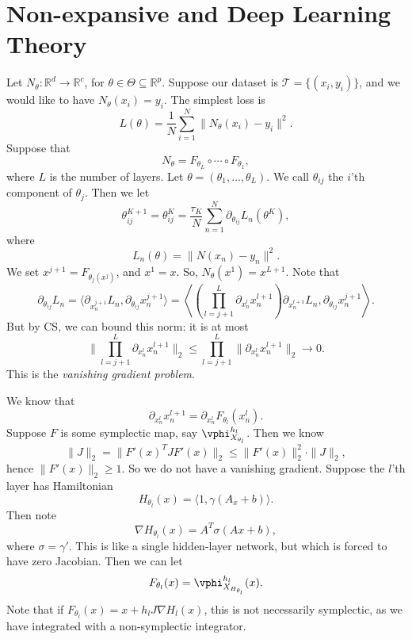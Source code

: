 \documentclass[12pt]{article}
\begin{document}
\newpage

\section{Non-expansive and Deep Learning Theory}%
\label{sec:nedlt}

Let $N_\theta : \mathbb{R}^{d} \to \mathbb{R}^{c}$, for $\theta \in \Theta \subseteq \mathbb{R}^{p}$. Suppose our dataset is $\mathcal{T} = \{(x_i, y_i)\}$, and we would like to have $N_\theta(x_i) = y_i$. The simplest loss is
\[
L(\theta) = \frac 1N \sum_{i = 1}^{N} \|N_\theta(x_i) - y_i\|^2.
\]
Suppose that
\[
N_\theta = F_{\theta_L} \circ \cdots \circ F_{\theta_1},
\]
where $L$ is the number of layers. Let $\theta = (\theta_1, \ldots, \theta_L)$. We call $\theta_{ij}$ the $i$'th component of $\theta_j$. Then we let
\[
\theta_{ij}^{K+1} = \theta_{ij}^{K} = \frac{\tau_K}{N} \sum_{n = 1}^{N} \partial_{\theta_{ij}} L_n(\theta^{K}),
\]
where
\[
L_n(\theta) = \|N(x_n) - y_n\|^2.
\]
We set $x^{j+1} = F_{\theta_j(x^j)}$, and $x^1 = x$. So, $N_{\theta}(x^1) = x^{L+1}$. Note that
\[
\partial_{\theta_{ij}} L_n = \langle \partial_{x_n^{j+1}} L_n, \partial_{\theta_{ij}} x_n^{j+1} \rangle = \left\langle  \left( \prod_{l = j+1}^{L} \partial_{x_n^{l}} x_n^{l+1} \right) \partial_{x_n^{l+1}} L_n, \partial_{\theta_{ij}} x_n^{j+1} \right\rangle.
\]
But by CS, we can bound this norm: it is at most
\[
\biggl\|\prod_{l = j+1}^{L} \partial_{x_n^{l}} x_n^{l+1}\biggr\|_2 \leq \prod_{l = j+1}^{L} \|\partial_{x_n^{l}} x_n^{l+1}\|_2 \to 0.
\]
This is the \emph{vanishing gradient problem}.


We know that
\[
\partial_{x^{l}_n} x_n^{l+1} = \partial_{x_n^{l}} F_{\theta_l}(x_n^{l}).
\]
Suppose $F$ is some symplectic map, say $\vphi_{X_{\theta_l}}^{h_l}$. Then we know
\[
\|J\|_2 = \|F'(x)^{T} J F'(x)\|_2 \leq \|F'(x)\|_2^2 \cdot \|J\|_2,
\]
hence $\|F'(x)\|_2 \geq 1$. So we do not have a vanishing gradient. Suppose the $l$'th layer has Hamiltonian
\[
H_{\theta_l}(x) = \langle 1, \gamma(A_x + b) \rangle.
\]
Then note
\[
\nabla H_{\theta_l}(x) = A^{T} \sigma(Ax + b),
\]
where $\sigma = \gamma'$. This is like a single hidden-layer network, but which is forced to have zero Jacobian. Then we can let
\[
F_{\theta_l}(x) = \vphi_{X_{H_{\theta_l}}}^{h_l}(x).
\]
Note that if $F_{\theta_l}(x) = x + h_l J \nabla H_l(x)$, this is not necessarily symplectic, as we have integrated with a non-symplectic integrator.
\end{document}

